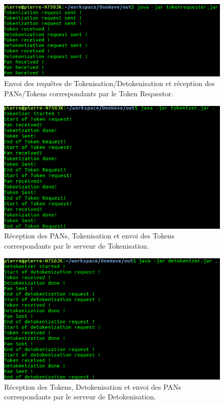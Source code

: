 \documentclass{report}
\begin{document}
\begin{figure}[!ht]
    \centering
			\includegraphics[scale=0.49]{img/client_tokenRequestor.png}
			\caption{\label{Trello} Envoi des requêtes de Tokenisation/Detokenisation et réception des PANs/Tokens correspondants par le Token Requestor.}			
\end{figure}

\begin{figure}[!ht]
    \centering
			\includegraphics[scale=0.49]{img/serveur_tokenizer.png}
			\caption{\label{Trello} Réception des PANs, Tokenisation et envoi des Tokens correspondants par le serveur de Tokenisation.}			
\end{figure}

\begin{figure}[!ht]
    \centering
			\includegraphics[scale=0.49]{img/serveur_detokenizer.png}
			\caption{\label{Trello} Réception des Tokens, Detokenisation et envoi des PANs correspondants par le serveur de Detokenisation.}			
\end{figure}
\end{document}
